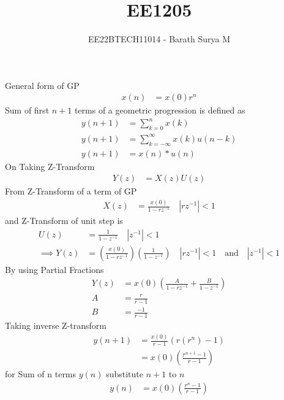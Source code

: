 \documentclass[journal,12pt,onecolumn]{IEEEtran}
\theoremstyle{remark}
\providecommand{\brak}[1]{\ensuremath{\left(#1\right)}}
\providecommand{\abs}[1]{\left\vert#1\right\vert}
\begin{document}

\vspace{3cm}

\title{EE1205}
\author{EE22BTECH11014 - Barath Surya M}
\maketitle
General form of GP
\begin{align}
	x\brak{n}&=x\brak{0}r^n
\end{align}
Sum of first $n+1$ terms of a geometric progression is defined as
\begin{align}
	y\brak{n+1} &= \sum_{k=0} ^{n} x\brak{k} \\
	y\brak{n+1} &= \sum_{k=-\infty} ^{\infty} x\brak{k} u\brak{n-k}\\
	y\brak{n+1} &= x\brak{n} *u\brak{n}
\end{align} 
On Taking Z-Transform 
\begin{align}
	Y\brak{z}&= X\brak{z} U\brak{z}
\end{align}
From Z-Transform of a term of GP 
\begin{align}
	X\brak{z}&=	\frac{x\brak{0}}{1-rz^{-1}} \quad \abs{rz^{-1}}<1
\end{align}
and Z-Transform of unit step is 
\begin{align}
	U\brak{z} &=\frac{1}{1-z^{-1}}  \quad \abs{z^{-1}}<1\\
	\implies Y\brak{z}&=\brak{\frac{x\brak{0}}{1-rz^{-1}}}\brak{\frac{1}{1-z^{-1}}} \quad \abs{rz^{-1}}<1 \quad \text{and}  \quad \abs{z^{-1}}<1
\end{align}
By using Partial Fractions
\begin{align}
	Y\brak{z}&=x\brak{0}\brak{\frac{A}{1-rz^{-1}} + \frac{B}{1-z^{-1}}}\\
	A&=\frac{r}{r-1}\\
	B&= \frac{-1}{r-1}
\end{align}
Taking inverse Z-transform 
\begin{align}
	y\brak{n+1}&=\frac{x\brak{0}}{r-1}\brak{r\brak{r^n}-1}\\
	&=x\brak{0}\brak{\frac{r^{n+1}-1}{r-1}}
\end{align}
for Sum of n terms $y\brak{n}$ substitute $n+1$ to $n$
\begin{align}
	y\brak{n} &= x\brak{0}\brak{\frac{r^n-1}{r-1}}
\end{align}
\end{document}
